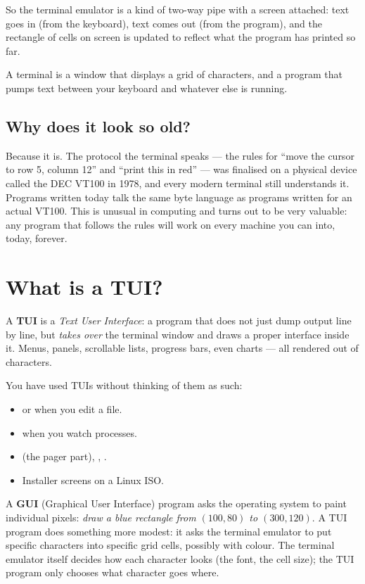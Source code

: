 So the terminal emulator is a kind of two-way pipe with a screen
attached: text goes in (from the keyboard), text comes out (from the
program), and the rectangle of cells on screen is updated to reflect
what the program has printed so far.

\begin{idea}
A terminal is a window that displays a grid of characters, and a
program that pumps text between your keyboard and whatever else is
running.
\end{idea}

\subsection{Why does it look so old?}

Because it is. The protocol the terminal speaks --- the rules for
``move the cursor to row 5, column 12'' and ``print this in red'' ---
was finalised on a physical device called the DEC VT100 in 1978, and
every modern terminal still understands it. Programs written today
talk the same byte language as programs written for an actual VT100.
This is unusual in computing and turns out to be very valuable: any
program that follows the rules will work on every machine you can
 into, today, forever.

\section{What is a TUI?}

A \textbf{TUI} is a \emph{Text User Interface}: a program that does
not just dump output line by line, but \emph{takes over} the terminal
window and draws a proper interface inside it. Menus, panels,
scrollable lists, progress bars, even charts --- all rendered out of
characters.

You have used TUIs without thinking of them as such:

\begin{itemize}[leftmargin=*]
  \item {} or  when you edit a file.
  \item {} when you watch processes.
  \item {} (the pager part), , .
  \item Installer screens on a Linux ISO.
\end{itemize}

A \textbf{GUI} (Graphical User Interface) program asks the operating
system to paint individual pixels: \emph{draw a blue rectangle from
$(100, 80)$ to $(300, 120)$}. A TUI program does something more
modest: it asks the terminal emulator to put specific characters into
specific grid cells, possibly with colour. The terminal emulator
itself decides how each character looks (the font, the cell size); the
TUI program only chooses what character goes where.

